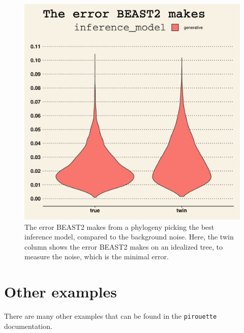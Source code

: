 \documentclass{article}
\begin{document}
\begin{figure}[h]
  \includegraphics[width=\textwidth]{figure_example_3.png}
  \caption{
    The error BEAST2 makes from a phylogeny 
    picking the best inference model, compared to the background noise.
    Here, the twin column shows the error BEAST2 makes on an idealized
    tree, to measure the noise, which is the minimal error. 
  }
  \label{fig:example_3}
\end{figure}

\section{Other examples}

There are many other examples that can be found in the \verb;pirouette; 
documentation.
\end{document}
